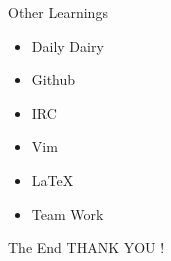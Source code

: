 \begin{frame}[t,fragile]{Other Learnings}
\begin{itemize}
\item<1-> Daily Dairy
\item<2-> Github
\item<3-> IRC
\item<4-> Vim
\item<5-> \LaTeX
\item<6-> Team Work
\end{itemize}
\end{frame}

\begin{frame}[t,fragile]{The End}
 THANK YOU !
\end{frame}

